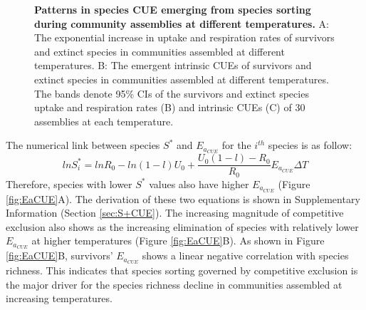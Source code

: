 \documentclass[11pt, a4paper]{article}
\begin{document}
\begin{spacing}{1.5}
\begin{figure}
\begin{tabular}{c@{}c@{}}
    \end{tabular}
    \caption{\textbf{Patterns in species CUE emerging from species sorting during community assemblies at different temperatures.} A: The exponential increase in uptake and respiration rates of survivors and extinct species in communities assembled at different temperatures. B: The emergent intrinsic CUEs of survivors and extinct species in communities assembled at different temperatures. The bands denote 95\% CIs of the survivors and extinct species uptake and respiration rates (B) and intrinsic CUEs (C) of 30 assemblies at each temperature. }
    \label{fig:CUE}
\end{figure}

The numerical link between species $S^*$ and $E_{a_{CUE}}$ for the $i^{th}$ species is as follow:
\begin{equation}\label{eq:S_Ea}
lnS^*_i = lnR_0 - ln(1-l)U_0 + \frac{U_0(1-l) - R_0}{R_0}E_{a_{CUE}}\Delta T
\end{equation}
Therefore, species with lower $S^*$ values also have higher $E_{a_{CUE}}$ (Figure \ref{fig:EaCUE}A). The derivation of these two equations is shown in Supplementary Information (Section \ref{sec:S+CUE}). The increasing magnitude of competitive exclusion also shows as the increasing elimination of species with relatively lower $E_{a_{CUE}}$ at higher temperatures (Figure \ref{fig:EaCUE}B). As shown in Figure \ref{fig:EaCUE}B, survivors' $E_{a_{CUE}}$ shows a linear negative correlation with species richness. This indicates that species sorting governed by competitive exclusion is the major driver for the species richness decline in communities assembled at increasing temperatures. 


\end{spacing}
\end{document}
